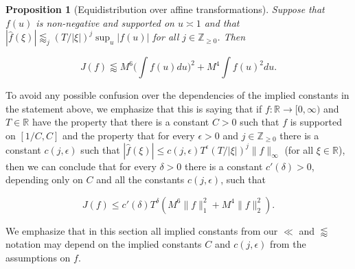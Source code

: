 \documentclass{amsart}
\theoremstyle{plain}
\newtheorem{prpstn}[thrm]{Proposition}
\numberwithin{equation}{section}
\begin{document}
\begin{prpstn}[Equidistribution over affine transformations] \label{propsumaff} Suppose that $f(u) $ is non-negative and supported on $u \asymp 1$ and that $|\widehat{f}(\xi)|\lessapprox_j (T/|\xi|)^j\sup_u |f(u)|$ for all $j\in \mathbb{Z}_{\ge 0}$.  Then 

\[ J(f) \lessapprox M^6 \Big( \int f(u) du \Big)^2 + M^4 \int f(u)^2 du.\]

\end{prpstn}

%
%

To avoid any possible confusion over the dependencies of the implied constants in the statement above, we emphasize that this is saying that if $f:\mathbb{R}\rightarrow [0,\infty)$ and $T\in \mathbb{R}$ have the property that there is a constant $C>0$ such that $f$ is supported on $[1/C,C]$ and the property that for every $\epsilon>0$ and $j\in\mathbb{Z}_{\ge 0}$ there is a constant $c(j,\epsilon)$ such that $|\widehat{f}(\xi)|\le c(j,\epsilon)T^\epsilon (T/|\xi|)^j\|f\|_\infty$ (for all $\xi \in \mathbb{R}$), then we can conclude that for every $\delta>0$ there is a constant $c'(\delta)>0$, depending only on $C$ and all the constants $c(j,\epsilon)$, such that

\[
J(f)\le c'(\delta)T^\delta(M^6\|f\|_1^2+M^4\|f\|_2^2).
\]

We emphasize that in this section all implied constants from our $\ll$ and $\lessapprox$ notation may depend on the implied constants $C$ and $c(j,\epsilon)$ from the assumptions on $f$.


%
%

\hfill\\
\end{document}
